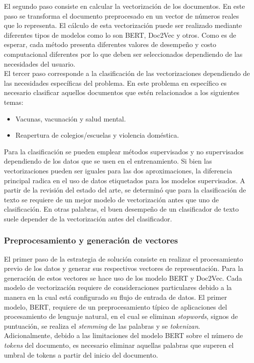 El segundo paso consiste en calcular la vectorización de los documentos. En este paso se transforma el documento preprocesado en un vector de números reales que lo representa. El cálculo de esta vectorización puede ser realizado mediante diferentes tipos de modelos como lo son BERT, Doc2Vec y otros. Como es de esperar, cada método presenta diferentes valores de desempeño y costo computacional diferentes por lo que deben ser seleccionados dependiendo de las necesidades del usuario. \\

El tercer paso corresponde a la clasificación de las vectorizaciones dependiendo de las necesidades específicas del problema. En este problema en específico es necesario clasificar aquellos documentos que estén relacionados a los siguientes temas:

\begin{itemize}
    \item Vacunas, vacunación y salud mental.
    \item Reapertura de colegios/escuelas y violencia doméstica.
\end{itemize}

Para la clasificación se pueden emplear métodos supervisados y no supervisados dependiendo de los datos que se usen en el entrenamiento. Si bien las vectorizaciones pueden ser iguales para las dos aproximaciones, la diferencia principal radica en el uso de datos etiquetados para los modelos supervisados. A partir de la revisión del estado del arte, se determinó que para la clasificación de texto se  requiere de un mejor modelo de vectorización antes que uno de clasificación. En otras palabras, el buen desempeño de un clasificador de texto suele depender de la vectorización antes del clasificador.

\subsubsection{Preprocesamiento y generación de vectores}
El primer paso de la estrategia de solución consiste en realizar el procesamiento previo de los datos y generar sus respectivos vectores de representación. Para la generación de estos vectores se hace uso de los modelo BERT y Doc2Vec. Cada modelo de vectorización requiere de consideraciones particulares debido a la manera en la cual está configurado su flujo de entrada de datos. El primer modelo, BERT, requiere de un preprocesamiento típico de aplicaciones del procesamiento de lenguaje natural, en el cual se eliminan \textit{stopwords}, signos de puntuación, se realiza el \textit{stemming} de las palabras y se \textit{tokenizan}. Adicionalmente, debido a las limitaciones del modelo BERT sobre el número de \textit{tokens} del documento, es necesario eliminar aquellas palabras que superen el umbral de tokens a partir del inicio del documento. \\

